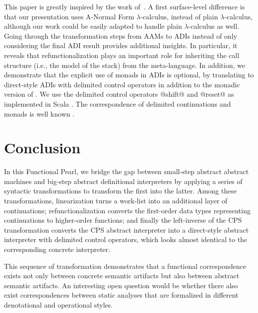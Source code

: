 \documentclass[acmsmall, review]{acmart}\settopmatter{}
\begin{document}
This paper is greatly inspired by the work of~\citet{darais2017abstracting}.
A first surface-level difference is that our presentation uses A-Normal Form $\lambda$-calculus, 
instead of plain $\lambda$-calculus, although our work could be easily adapted to handle plain 
$\lambda$-calculus as well. Going through the transformation steps from AAMs to ADIs instead of 
only considering the final ADI result provides additional insights. In particular, it reveals that 
refunctionalization plays an important role for inheriting the call structure (i.e., the model of 
the stack) from the meta-language. 
In addition, we demonstrate that the explicit use of monads in ADIs is optional, by translating to
direct-style ADIs with delimited control operators in addition to the monadic version of \citet{darais2017abstracting}. 
We use the delimited control operators @shift@ and @reset@ \cite{Danvy:1990:AC:91556.91622} as implemented in Scala 
\cite{rompf2009implementing}. The correspondence of delimited continuations and monads is well known
\cite{Danvy:1990:AC:91556.91622, wadler1992essence, danvy1992representing, moggi1991notions, filinski1994representing}.

\section{Conclusion}\label{sec:conclusion}


In this Functional Pearl, we bridge the gap between small-step abstract abstract machines
and big-step abstract definitional interpreters by applying a series of syntactic 
transformations to transform the first into the latter. Among these transformations, 
linearization turns a work-list into an additional layer of continuations; refunctionalization 
converts the first-order data types representing continuations to higher-order functions; 
and finally the left-inverse of the CPS transformation converts the CPS abstract interpreter 
into a direct-style abstract interpreter with delimited control operators, which looks almost 
identical to the corresponding concrete interpreter.

This sequence of transformation demonstrates that a functional correspondence exists 
not only between concrete semantic artifacts but also between abstract semantic artifacts. 
An interesting open question would be whether there also exist correspondences between 
static analyses that are formalized 
in different denotational and operational styles.
\end{document}
